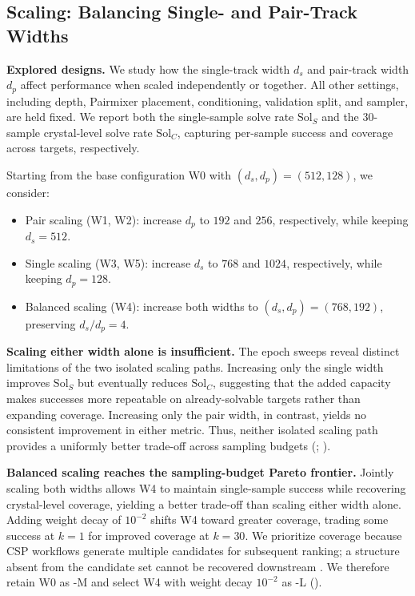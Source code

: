 \subsection{Scaling: Balancing Single- and Pair-Track Widths}
\label{sec:recipe-model-scaling}

\textbf{Explored designs.}
We study how the single-track width $d_s$ and pair-track width $d_p$ affect
performance when scaled independently or together. All other settings, including
depth, Pairmixer placement, conditioning, validation split, and sampler, are held
fixed. We report both the single-sample solve rate $\mathrm{Sol}_S$ and the
30-sample crystal-level solve rate $\mathrm{Sol}_C$, capturing per-sample success
and coverage across targets, respectively.

Starting from the base configuration W0 with $(d_s,d_p)=(512,128)$, we consider:
\begin{itemize}
    \item Pair scaling (W1, W2): increase $d_p$ to $192$ and $256$,
    respectively, while keeping $d_s=512$.
    \item Single scaling (W3, W5): increase $d_s$ to $768$ and $1024$,
    respectively, while keeping $d_p=128$.
    \item Balanced scaling (W4): increase both widths to
    $(d_s,d_p)=(768,192)$, preserving $d_s/d_p=4$.
\end{itemize}

\textbf{Scaling either width alone is insufficient.}
The epoch sweeps reveal distinct limitations of the two isolated scaling paths.
Increasing only the single width improves $\mathrm{Sol}_S$ but eventually reduces
$\mathrm{Sol}_C$, suggesting that the added capacity makes successes more
repeatable on already-solvable targets rather than expanding coverage. Increasing
only the pair width, in contrast, yields no consistent improvement in either
metric. Thus, neither isolated scaling path provides a uniformly better trade-off
across sampling budgets
(; ).

\textbf{Balanced scaling reaches the sampling-budget Pareto frontier.}
Jointly scaling both widths allows W4 to maintain single-sample success while
recovering crystal-level coverage, yielding a better trade-off than scaling either
width alone. Adding weight decay of $10^{-2}$ shifts W4 toward greater coverage,
trading some success at $k{=}1$ for improved coverage at $k{=}30$. We prioritize
coverage because CSP workflows generate multiple candidates for subsequent ranking;
a structure absent from the candidate set cannot be recovered downstream
\citep{hunnisett2024seventhranking,hunnisett2024seventhgeneration}.
We therefore retain W0 as \model{}-M and select W4 with weight decay
$10^{-2}$ as \model{}-L ().




